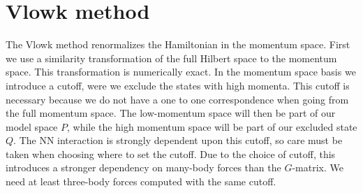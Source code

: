 %
%
%
%

\section{Vlowk method}

The Vlowk method renormalizes the Hamiltonian in the momentum space. First we
use a similarity transformation of the full Hilbert space to the momentum
space. This transformation is numerically exact. In the momentum space basis
we introduce a cutoff, were we exclude the states with high momenta. This
cutoff is necessary because we do not have a one to one correspondence when
going from the full momentum space. The low-momentum space will then be part
of our model space $P$, while the high momentum space will be part of our
excluded state $Q$. The NN interaction is strongly dependent upon this cutoff,
so care must be taken when choosing where to set the cutoff. Due to the choice
of cutoff, this introduces a stronger dependency on many-body forces than the
$G$-matrix. We need at least three-body forces computed with the same cutoff.

